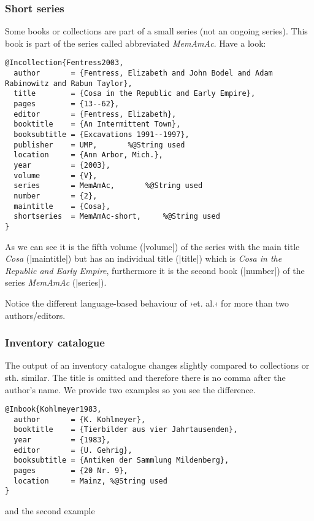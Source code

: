 \documentclass[a4paper,
10pt,
greek,
french,
spanish,
italian,
ngerman,
english
]{ltxdoc}
\begin{document}
 \subsubsection{Short  series}
Some books or collections are part of a small series (not an ongoing series).
This book is part of the series called abbreviated \emph{MemAmAc}.
Have a look:
\begin{lstlisting}[style=bibentry,label=Fentress2003,caption={{@}Incollection\{Fentress2003,…\} }]
@Incollection{Fentress2003,
  author       = {Fentress, Elizabeth and John Bodel and Adam Rabinowitz and Rabun Taylor},
  title        = {Cosa in the Republic and Early Empire},
  pages        = {13--62},
  editor       = {Fentress, Elizabeth},
  booktitle    = {An Intermittent Town},
  booksubtitle = {Excavations 1991--1997},
  publisher    = UMP,		%@String used
  location     = {Ann Arbor, Mich.},
  year         = {2003},
  volume       = {V},
  series       = MemAmAc,		%@String used
  number       = {2},
  maintitle    = {Cosa},
  shortseries  = MemAmAc-short,		%@String used
}
\end{lstlisting}
As we can see it is the fifth volume (|volume|) of the series with the main title \emph{Cosa} (|maintitle|) but has an individual title (|title|) which is \emph{Cosa in the Republic and Early Empire}, furthermore it is the second book (|number|) of the series  \emph{MemAmAc} (|series|).

Notice the different language-based behaviour of ›et. al.‹ for more than two authors/editors.

 
 
 \subsubsection{Inventory catalogue}
The output of an inventory catalogue changes slightly compared to collections or sth. similar. 
The title is omitted and therefore there is no comma after the author’s name.
We provide two examples so you see the difference.
\begin{lstlisting}[style=bibentry,label=Kohlmeyer1983,caption={{@}Inbook\{Kohlmeyer1983,…\} }]
@Inbook{Kohlmeyer1983,
  author       = {K. Kohlmeyer},
  booktitle    = {Tierbilder aus vier Jahrtausenden},
  year         = {1983},
  editor       = {U. Gehrig},
  booksubtitle = {Antiken der Sammlung Mildenberg},
  pages        = {20 Nr. 9},
  location     = Mainz, %@String used
}
\end{lstlisting}
and the second example
\end{document}

